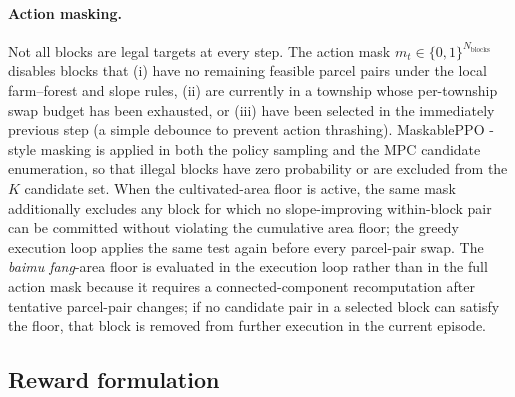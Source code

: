 \documentclass[11pt]{article}
\begin{document}
\paragraph{Action masking.}
Not all blocks are legal targets at every step. The action mask $m_t \in \{0, 1\}^{N_{\text{blocks}}}$ disables blocks that (i) have no remaining feasible parcel pairs under the local farm--forest and slope rules, (ii) are currently in a township whose per-township swap budget has been exhausted, or (iii) have been selected in the immediately previous step (a simple debounce to prevent action thrashing). MaskablePPO \citep{ross2011reduction,schulman2017proximal,huang2022maskable}-style masking is applied in both the policy sampling and the MPC candidate enumeration, so that illegal blocks have zero probability or are excluded from the $K$ candidate set. When the cultivated-area floor is active, the same mask additionally excludes any block for which no slope-improving within-block pair can be committed without violating the cumulative area floor; the greedy execution loop applies the same test again before every parcel-pair swap. The \textit{baimu fang}-area floor is evaluated in the execution loop rather than in the full action mask because it requires a connected-component recomputation after tentative parcel-pair changes; if no candidate pair in a selected block can satisfy the floor, that block is removed from further execution in the current episode.

\subsection{Reward formulation}\label{sec:methods-reward}
\end{document}
